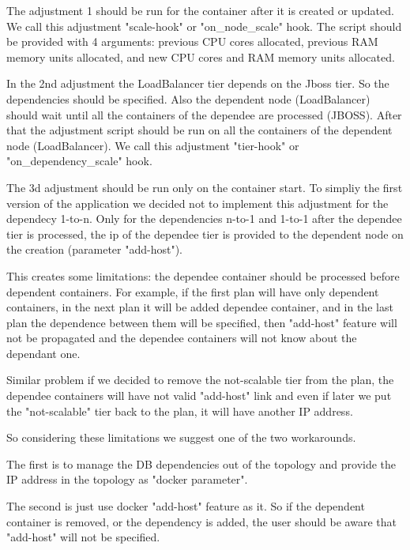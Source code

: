 The adjustment 1 should be run for the container after it is created or updated. We call this adjustment "scale-hook" or "on\_node\_scale" hook. The script should be provided with 4 arguments: previous CPU cores allocated, previous RAM memory units allocated, and new CPU cores and RAM memory units allocated.

In the 2nd adjustment   the LoadBalancer tier depends on the Jboss tier. So the dependencies should be specified. Also the dependent node (LoadBalancer) should wait until all the containers of the dependee are processed (JBOSS). After that the adjustment script should be run on all the containers of the dependent node (LoadBalancer). We call this adjustment "tier-hook" or "on\_dependency\_scale" hook.

The 3d adjustment should be run only on the container start. To simpliy the first version of the application we decided not to implement this adjustment for the dependecy 1-to-n. Only for the dependencies n-to-1 and 1-to-1 after the dependee tier is processed, the ip of the dependee tier is provided to the dependent node on the creation (parameter "add-host"). 

This creates some limitations: the dependee container should be processed before dependent containers. For example, if the first plan will have only dependent containers, in the next plan it will be added dependee container, and in the last plan the dependence between them will be specified, then "add-host" feature will not be propagated and the dependee containers will not know about the dependant one.

Similar problem if we decided to remove the not-scalable tier from the plan, the dependee containers will have not valid "add-host" link and even if later we put the "not-scalable" tier back to the plan, it will have another IP address.

So considering these limitations we suggest one of the two workarounds.

The first is to manage the DB dependencies out of the topology and provide the IP address in the topology as "docker parameter".

The second is just use docker "add-host" feature as it. So if the dependent container is removed, or the dependency is added, the user should be aware that "add-host" will not be specified.

